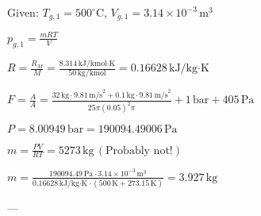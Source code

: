 Given: \( T_{g,1} = 500^\circ \text{C} \), \( V_{g,1} = 3.14 \times 10^{-3} \, \text{m}^3 \)  

\( p_{g,1} = \frac{mRT}{V} \)  

\( R = \frac{R_M}{M} = \frac{8.314 \, \text{kJ}/\text{kmol·K}}{50 \, \text{kg/kmol}} = 0.16628 \, \text{kJ}/\text{kg·K} \)  

\( F = \frac{A}{A} = \frac{32 \, \text{kg} \cdot 9.81 \, \text{m/s}^2 + 0.1 \, \text{kg} \cdot 9.81 \, \text{m/s}^2}{25 \pi (0.05)^2 \pi} + 1 \, \text{bar} + 405 \, \text{Pa} \)  

\( P = 8.00949 \, \text{bar} = 190094.49006 \, \text{Pa} \)  

\( m = \frac{PV}{RT} = 5273 \, \text{kg} \, (\text{Probably not!}) \)  

\( m = \frac{190094.49 \, \text{Pa} \cdot 3.14 \times 10^{-3} \, \text{m}^3}{0.16628 \, \text{kJ}/\text{kg·K} \cdot (500 \, \text{K} + 273.15 \, \text{K})} = 3.927 \, \text{kg} \)  

---